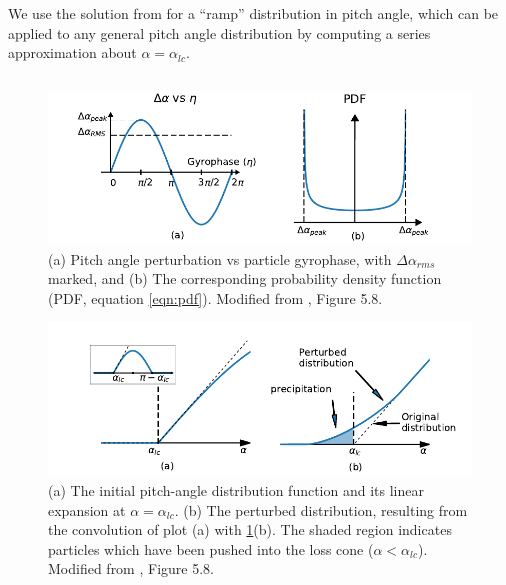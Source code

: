 We use the solution from \cite{Bortnik2005} for a ``ramp'' distribution in pitch angle, which can be applied to any general pitch angle distribution by computing a series approximation about $\alpha = \alpha_{lc}$.

\begin{equation}
\end{equation}


\begin{figure}[t]
\begin{center}
\includegraphics{figures/da_dist_and_pdf.pdf}
\caption[Pitch angle perturbation vs gyrophase, and corresponding PDF]{(a) Pitch angle perturbation vs particle gyrophase, with $\Delta \alpha_{rms}$ marked, and (b) The corresponding probability density function (PDF, equation \eqref{eqn:pdf}). Modified from \cite{Bortnik2005}, Figure 5.8.}
\label{fig:da_vs_eta_and_pdf}
\end{center}
\end{figure}

\begin{figure}[h]
\begin{center}
\includegraphics{figures/da_dist_and_perturbation.pdf}
\caption[Perturbed pitch-angle distribution]{(a) The initial pitch-angle distribution function and its linear expansion at $\alpha = \alpha_{lc}$. (b) The perturbed distribution, resulting from the convolution of plot (a) with \ref{fig:da_vs_eta_and_pdf}(b). The shaded region indicates particles which have been pushed into the loss cone ($\alpha < \alpha_{lc}$). Modified from \cite{Bortnik2005}, Figure 5.8.}
\label{fig:da_dist_and_perturbation}
\end{center}
\end{figure}

